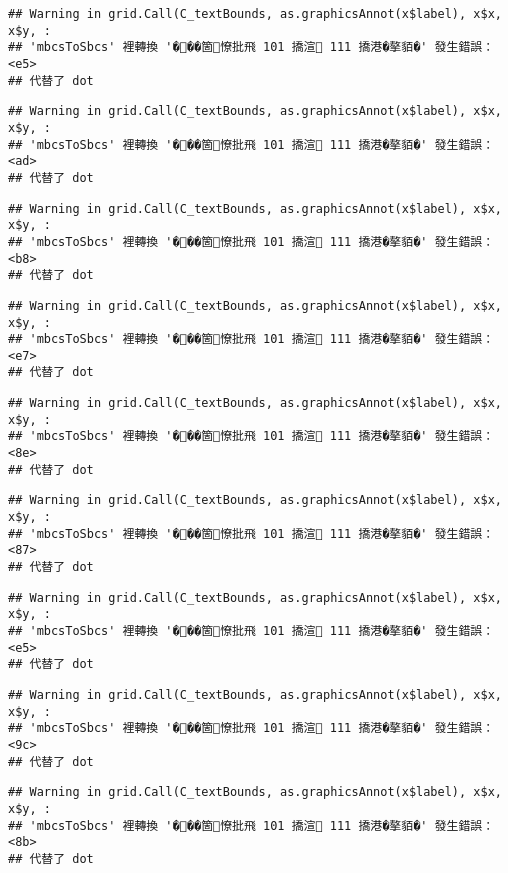 \documentclass[
]{article}
\begin{document}
\begin{verbatim}
## Warning in grid.Call(C_textBounds, as.graphicsAnnot(x$label), x$x, x$y, :
## 'mbcsToSbcs' 裡轉換 '���箇憭批飛 101 撟渲 111 撟港�摮貊�' 發生錯誤：<e5>
## 代替了 dot
\end{verbatim}

\begin{verbatim}
## Warning in grid.Call(C_textBounds, as.graphicsAnnot(x$label), x$x, x$y, :
## 'mbcsToSbcs' 裡轉換 '���箇憭批飛 101 撟渲 111 撟港�摮貊�' 發生錯誤：<ad>
## 代替了 dot
\end{verbatim}

\begin{verbatim}
## Warning in grid.Call(C_textBounds, as.graphicsAnnot(x$label), x$x, x$y, :
## 'mbcsToSbcs' 裡轉換 '���箇憭批飛 101 撟渲 111 撟港�摮貊�' 發生錯誤：<b8>
## 代替了 dot
\end{verbatim}

\begin{verbatim}
## Warning in grid.Call(C_textBounds, as.graphicsAnnot(x$label), x$x, x$y, :
## 'mbcsToSbcs' 裡轉換 '���箇憭批飛 101 撟渲 111 撟港�摮貊�' 發生錯誤：<e7>
## 代替了 dot
\end{verbatim}

\begin{verbatim}
## Warning in grid.Call(C_textBounds, as.graphicsAnnot(x$label), x$x, x$y, :
## 'mbcsToSbcs' 裡轉換 '���箇憭批飛 101 撟渲 111 撟港�摮貊�' 發生錯誤：<8e>
## 代替了 dot
\end{verbatim}

\begin{verbatim}
## Warning in grid.Call(C_textBounds, as.graphicsAnnot(x$label), x$x, x$y, :
## 'mbcsToSbcs' 裡轉換 '���箇憭批飛 101 撟渲 111 撟港�摮貊�' 發生錯誤：<87>
## 代替了 dot
\end{verbatim}

\begin{verbatim}
## Warning in grid.Call(C_textBounds, as.graphicsAnnot(x$label), x$x, x$y, :
## 'mbcsToSbcs' 裡轉換 '���箇憭批飛 101 撟渲 111 撟港�摮貊�' 發生錯誤：<e5>
## 代替了 dot
\end{verbatim}

\begin{verbatim}
## Warning in grid.Call(C_textBounds, as.graphicsAnnot(x$label), x$x, x$y, :
## 'mbcsToSbcs' 裡轉換 '���箇憭批飛 101 撟渲 111 撟港�摮貊�' 發生錯誤：<9c>
## 代替了 dot
\end{verbatim}

\begin{verbatim}
## Warning in grid.Call(C_textBounds, as.graphicsAnnot(x$label), x$x, x$y, :
## 'mbcsToSbcs' 裡轉換 '���箇憭批飛 101 撟渲 111 撟港�摮貊�' 發生錯誤：<8b>
## 代替了 dot
\end{verbatim}
\end{document}
